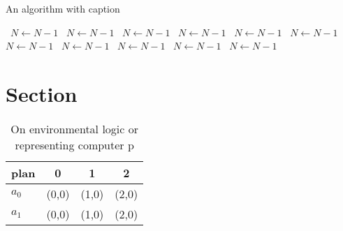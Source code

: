 \documentclass[a4paper]{article}
\begin{document}
\begin{algorithm}
\caption{An algorithm with caption}
\begin{algorithmic}
\    \State $N \gets N - 1$
\    \State $N \gets N - 1$
\    \State $N \gets N - 1$
\    \State $N \gets N - 1$
\    \State $N \gets N - 1$
\    \State $N \gets N - 1$
\    \State $N \gets N - 1$
\    \State $N \gets N - 1$
\    \State $N \gets N - 1$
\    \State $N \gets N - 1$
\    \State $N \gets N - 1$
\EndWhile
\end{algorithmic}
\end{algorithm}

\section{Section}

\begin{table}
\begin{adjustbox}{width=0.6\columnwidth}
\begin{tabular}{|l|l|l|l|}
\hline
\textbf{plan} & \multicolumn{1}{c|}{\textbf{0}} & \multicolumn{1}{c|}{\textbf{1}} & \multicolumn{1}{c|}{\textbf{2}} \\ \hline
\textbf{$a_0$}  & (0,0) & (1,0) & (2,0) \\ \hline
\textbf{$a_1$}  & (0,0) & (1,0) & (2,0) \\ \hline
\end{tabular}
\end{adjustbox}
\caption{On environmental logic or representing computer p
}
\end{table}
\end{document}
